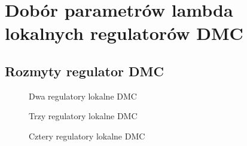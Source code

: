 \section{Dobór parametrów lambda lokalnych regulatorów DMC}
\label{projekt:zad7}

\subsection{Rozmyty regulator DMC}
\label{projekt:zad6:PID}

\begin{figure}[H] 
   \centering
   
   \caption{Dwa regulatory lokalne DMC}
   \label{projekt:zad7:DMC:2:figure}
\end{figure}

\begin{figure}[H] 
   \centering
   
   \caption{Trzy regulatory lokalne DMC}
   \label{projekt:zad7:DMC:3:figure}
\end{figure}

\begin{figure}[H] 
   \centering
   
   \caption{Cztery regulatory lokalne DMC}
   \label{projekt:zad7:DMC:4:figure}
\end{figure}
\newpage
